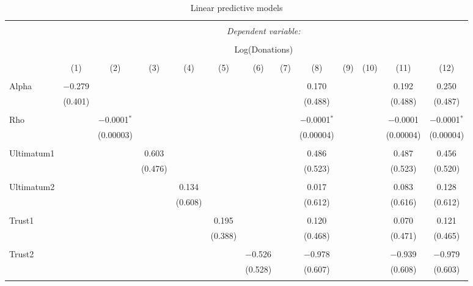 \begin{table}[H] \centering 
  \caption{Linear predictive models} 
  \label{} 
  \begin{adjustbox}{width=\textwidth}
  \begin{tabular}{@{\extracolsep{5pt}}lcccccccccccc} 
\\[-1.8ex]\hline 
\hline \\[-1.8ex] 
 & \multicolumn{12}{c}{\textit{Dependent variable:}} \\ 
\cline{2-13} 
\\[-1.8ex] & \multicolumn{12}{c}{Log(Donations)} \\ 
\\[-1.8ex] & (1) & (2) & (3) & (4) & (5) & (6) & (7) & (8) & (9) & (10) & (11) & (12)\\ 
\hline \\[-1.8ex] 
 Alpha & $-$0.279 &  &  &  &  &  &  & 0.170 &  &  & 0.192 & 0.250 \\ 
  & (0.401) &  &  &  &  &  &  & (0.488) &  &  & (0.488) & (0.487) \\ 
  & & & & & & & & & & & & \\ 
 Rho &  & $-$0.0001$^{*}$ &  &  &  &  &  & $-$0.0001$^{*}$ &  &  & $-$0.0001 & $-$0.0001$^{*}$ \\ 
  &  & (0.00003) &  &  &  &  &  & (0.00004) &  &  & (0.00004) & (0.00004) \\ 
  & & & & & & & & & & & & \\ 
 Ultimatum1 &  &  & 0.603 &  &  &  &  & 0.486 &  &  & 0.487 & 0.456 \\ 
  &  &  & (0.476) &  &  &  &  & (0.523) &  &  & (0.523) & (0.520) \\ 
  & & & & & & & & & & & & \\ 
 Ultimatum2 &  &  &  & 0.134 &  &  &  & 0.017 &  &  & 0.083 & 0.128 \\ 
  &  &  &  & (0.608) &  &  &  & (0.612) &  &  & (0.616) & (0.612) \\ 
  & & & & & & & & & & & & \\ 
 Trust1 &  &  &  &  & 0.195 &  &  & 0.120 &  &  & 0.070 & 0.121 \\ 
  &  &  &  &  & (0.388) &  &  & (0.468) &  &  & (0.471) & (0.465) \\ 
  & & & & & & & & & & & & \\ 
 Trust2 &  &  &  &  &  & $-$0.526 &  & $-$0.978 &  &  & $-$0.939 & $-$0.979 \\ 
  &  &  &  &  &  & (0.528) &  & (0.607) &  &  & (0.608) & (0.603) \\ 
  & & & & & & & & & & & & \\ 

\end{tabular}
\end{adjustbox}
\end{table}
